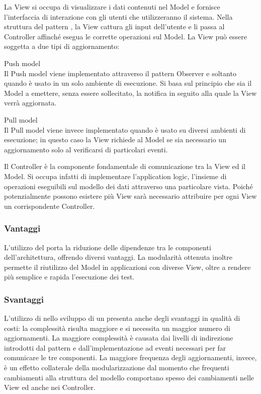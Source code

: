 \documentclass[a4paper, titlepage]{article}
\begin{document}
La View si occupa di visualizzare i dati contenuti nel Model e fornisce l’interfaccia di interazione con gli utenti che utilizzeranno il sistema.
Nella struttura del pattern , la View cattura gli input dell’utente e li passa al Controller affinché esegua le corrette operazioni sul Model.
\newline La View può essere soggetta a due tipi di aggiornamento:
\begin{description}
\item{Push model} 
\\Il Push model viene implementato attraverso il pattern Observer e soltanto quando  è usato in un solo ambiente di esecuzione. Si basa sul principio che sia il Model a emettere, senza essere sollecitato, la notifica in seguito alla quale la View verrà aggiornata.
\item{Pull model}
\\Il Pull model viene invece implementato quando  è usato su diversi ambienti di esecuzione; in questo caso la View richiede al Model se sia necessario un aggiornamento solo al verificarsi di particolari eventi.
\end{description}

Il Controller è la componente fondamentale di comunicazione tra la View ed il Model. Si occupa infatti di implementare l’application logic, l’insieme di operazioni eseguibili sul modello dei dati attraverso una particolare vista.
\newline Poiché potenzialmente possono esistere più View sarà necessario attribuire per ogni View un corrispondente Controller.

\subsubsection{Vantaggi}
L'utilizzo del   porta la riduzione delle dipendenze tra le componenti dell'architettura, offrendo diversi vantaggi. La modularità ottenuta inoltre permette il riutilizzo del Model in applicazioni con diverse View, oltre a rendere più semplice e rapida l’esecuzione dei test.

\subsubsection{Svantaggi}
L’utilizzo di  nello sviluppo di un  presenta anche degli svantaggi in qualità di costi: la complessità risulta maggiore e si necessita un maggior  numero di aggiornamenti.
\newline La maggiore complessità è causata dai livelli di indirezione introdotti dal pattern e dall’implementazione ad eventi necessari per far comunicare le tre componenti.
\newline La maggiore frequenza degli aggiornamenti, invece, è un effetto collaterale della modularizzazione dal momento che frequenti cambiamenti alla struttura del modello comportano spesso dei cambiamenti nelle View ed anche nei Controller.
\end{document}
